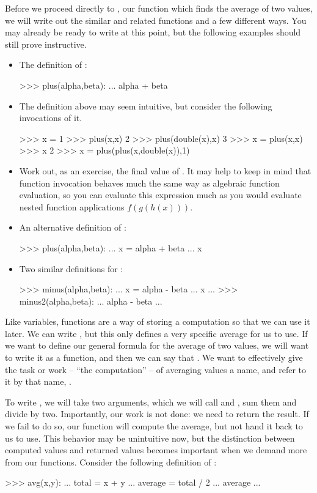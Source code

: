 Before we proceed directly to , our function which finds the average of two values, we will write out the similar and related functions  and  a few different ways.
You may already be ready to write  at this point, but the following examples should still prove instructive.
\begin{itemize}
    \item The definition of :
\begin{codeblock}
>>>  plus(alpha,beta):
...      alpha + beta
\end{codeblock}
    \item The definition above may seem intuitive, but consider the following invocations of it.
\begin{codeblock}
>>> x = 1
>>> plus(x,x)
2
>>> plus(double(x),x)
3
>>> x = plus(x,x)
>>> x
2
>>> x = plus(plus(x,double(x)),1)
\end{codeblock}
    \item Work out, as an exercise, the final value of .
        It may help to keep in mind that function invocation behaves much the same way as algebraic function evaluation, so you can evaluate this expression much as you would evaluate nested function applications $f(g(h(x)))$.
    \item An alternative definition of :
\begin{codeblock}
>>>  plus(alpha,beta):
...     x = alpha + beta
...      x
\end{codeblock}
    \item Two similar definitions for :
\begin{codeblock}
>>>  minus(alpha,beta):
...     x = alpha - beta
...      x
...
>>>  minus2(alpha,beta):
...      alpha - beta
...
\end{codeblock}
\end{itemize}

Like variables, functions are a way of storing a computation so that we can use it later.
We can write , but this only defines a very specific average for us to use.
If we want to define our general formula for the average of two values, we will want to write it as a function, and then we can say that .
We want to effectively give the task or work -- ``the computation'' -- of averaging values a name, and refer to it by that name, .

To write , we will take two arguments, which we will call  and , sum them and divide by two.
Importantly, our work is not done: we need to return the result.
If we fail to do so, our function  will compute the average, but not hand it back to us to use.
This behavior may be unintuitive now, but the distinction between computed values and returned values becomes important when we demand more from our functions.
Consider the following definition of :
\begin{codeblock}
>>>  avg(x,y):
...     total = x + y
...     average = total / 2
...      average
...
\end{codeblock}
